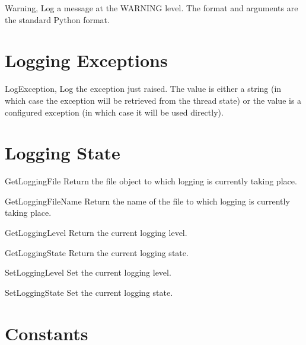 \documentclass{manual}
\begin{document}
\begin{funcdesc}{Warning}{, }
  Log a message at the WARNING level. The format and arguments are the standard
  Python format.
\end{funcdesc}


\section{Logging Exceptions \label{pyLogExceptions}}

\begin{funcdesc}{LogException}{,
    }
  Log the exception just raised. The value is either a string (in which case
  the exception will be retrieved from the thread state) or the value is a
  configured exception (in which case it will be used directly).
\end{funcdesc}


\section{Logging State \label{pyLoggingState}}

\begin{funcdesc}{GetLoggingFile}{}
  Return the file object to which logging is currently taking place.
\end{funcdesc}

\begin{funcdesc}{GetLoggingFileName}{}
  Return the name of the file to which logging is currently taking place.
\end{funcdesc}

\begin{funcdesc}{GetLoggingLevel}{}
  Return the current logging level.
\end{funcdesc}

\begin{funcdesc}{GetLoggingState}{}
  Return the current logging state.
\end{funcdesc}

\begin{funcdesc}{SetLoggingLevel}{}
  Set the current logging level.
\end{funcdesc}

\begin{funcdesc}{SetLoggingState}{}
  Set the current logging state.
\end{funcdesc}

\section{Constants}\label{constants}
\end{document}
